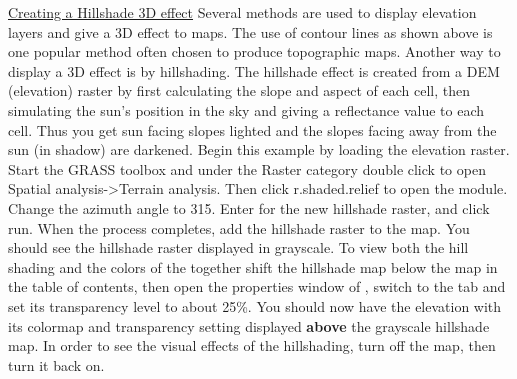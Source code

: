 \underline{Creating a Hillshade 3D effect}\linebreak 
Several methods are used to display elevation layers and give a 3D effect to maps. The use of contour lines as shown above is one popular method often chosen to produce topographic maps. Another way to display a 3D effect is by hillshading. The hillshade effect is created from a DEM (elevation) raster by first calculating the slope and aspect of each cell, then simulating the sun's position in the sky and giving a reflectance value to each cell. Thus you get sun facing slopes lighted and the slopes facing away from the sun (in shadow) are darkened.
Begin this example by loading the  elevation raster. Start the GRASS toolbox and under the Raster category double click to open Spatial analysis->Terrain analysis. Then click r.shaded.relief to open the module. Change the azimuth angle to 315. Enter  for the new hillshade raster, and click run. When the process completes, add the hillshade raster to the map. You should see the hillshade raster displayed in grayscale. To view both the hill shading and the colors of the  together shift the hillshade map below the  map in the table of contents, then open the properties window of , switch to the  tab and set its transparency level to about 25\%. You should now have the  elevation with its colormap and transparency setting displayed \textbf{above} the grayscale hillshade map. In order to see the visual effects of the hillshading, turn off the  map, then turn it back on.

